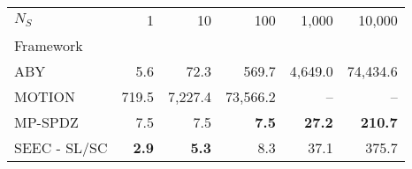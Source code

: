 \begin{tabular}{lrrrrr}
\toprule
$N_S$ & 1 & 10 & 100 & 1,000 & 10,000 \\
Framework &  &  &  &  &  \\
\midrule
ABY~\cite{DSZ15} & 5.6 & 72.3 & 569.7 & 4,649.0 & 74,434.6 \\
MOTION~\cite{BDST22} & 719.5 & 7,227.4 & 73,566.2 & -- & -- \\
MP-SPDZ~\cite{CCS:Keller20} & 7.5 & 7.5 & \bfseries 7.5 & \bfseries 27.2 & \bfseries 210.7 \\
SEEC - SL/SC & \bfseries 2.9 & \bfseries 5.3 & 8.3 & 37.1 & 375.7 \\
\bottomrule
\end{tabular}
